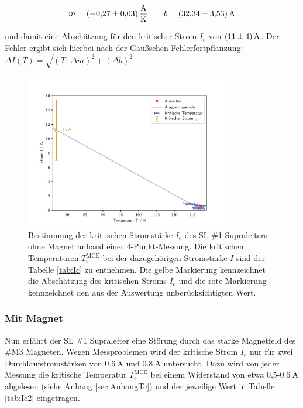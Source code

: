 \begin{equation*}
	m = \SI{-0,27\pm0,03}{\ampere\per\kelvin}
	\qquad
	b = \SI{32,34\pm3,53}{\ampere}
	\label{AF4}
\end{equation*}

\noindent
und damit eine Abschätzung für den kritischer Strom $I_{\text{c}}$ von
$\SI{11\pm4}{\ampere}$. Der Fehler ergibt sich hierbei nach der Gaußschen
Fehlerfortpflanzung: $\Delta I(T) = \sqrt{(T\cdot \Delta m)^2+(\Delta b)^2}$

\begin{figure}[H]
    \centering
    \includegraphics[width=0.8\textwidth]{Auswertung/I_krit_Pt/I_krit.pdf}
    \caption{Bestimmung der krituschen Stromstärke $I_{\text{c}}$ des SL \#1 Supraleiters ohne
		Magnet anhand einer 4-Punkt-Messung. Die kritischen Temperaturen $T^{\text{MCE}}_{\text{c}}$
		bei der dazugehörigen Stromstärke $I$ sind der Tabelle \ref{tab:Ic} zu entnehmen.
		Die gelbe Markierung kennzeichnet die Abschätzung des kritischen Stroms $I_{\text{c}}$
		und die rote Markierung kennzeichnet den aus der Auswertung unberücksichtigten Wert.}
\label{fig:Ic}
\end{figure}

\subsubsection{Mit Magnet}
\label{sec:mitB1}
Nun erfährt der SL \#1 Supraleiter eine Störung durch das starke Magnetfeld des
\#M3 Magneten. Wegen Messproblemen wird der kritische Strom $I_{\text{c}}$ nur für zwei
Durchlaufstromstärken von $\SI{0,6}{\ampere}$ und $\SI{0,8}{\ampere}$ untersucht.
Dazu wird von jeder Messung
die kritische Temperatur $T^{\text{MCE}}_{\text{c}}$ bei einem Widerstand von etwa
0,5-$\SI{0,6}{\ampere}$ abgelesen (siehe Anhang \ref{sec:AnhangTc}) und der
jeweilige Wert in Tabelle \ref{tab:Ic2} eingetragen.

